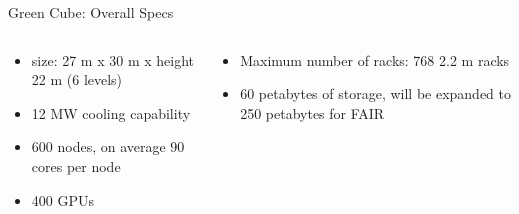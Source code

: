\begin{frame}{Green Cube: Overall Specs}
    \begin{columns}
        \begin{column}{0.5\textwidth}
            \begin{itemize}
                \item size: 27 \si{\meter} x 30 \si{\meter} x height 22 \si{\meter} (6 levels)
                \item 12 \si{\mega\watt} cooling capability
                \item 600 nodes, on average 90 cores per node
                \item 400 GPUs
            \end{itemize}
        \end{column}
        \begin{column}{0.5\textwidth}
            \begin{itemize}
                \item Maximum number of racks: 768 2.2 \si{\meter} racks
                \item 60 petabytes of storage, will be expanded to 250 petabytes for FAIR
            \end{itemize}
        \end{column}
    \end{columns}
\end{frame}



